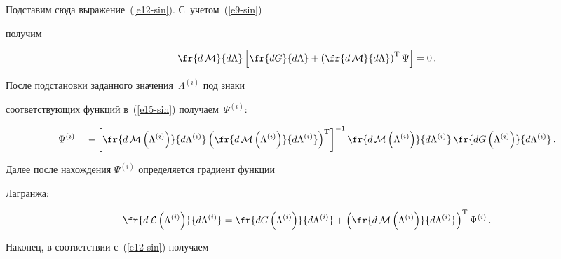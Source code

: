      Подставим сюда выражение~(\ref{e12-sin}). С~учетом~(\ref{e9-sin})

получим

     \begin{equation}

     \fr{d\,\mathcal{M}}{d\Lambda} \left[ \fr{dG}{d\Lambda} +\left(

\fr{d\,\mathcal{M}}{d\Lambda}\right)^{\mathrm{T}} \Psi\right] =0\,.

     \label{e15-sin}

     \end{equation}



     После подстановки заданного значения~$\Lambda^{(i)}$ под знаки

соответствующих функций в~(\ref{e15-sin}) получаем~$\Psi^{(i)}$:

     \begin{equation}

     \Psi^{(i)} =-\left[ \fr{d\,\mathcal{M}\left(\Lambda^{(i)}\right)}

     {d\Lambda^{(i)}}\left(

\fr{ d\,\mathcal{M}\left(\Lambda^{(i)}\right)}{d\Lambda^{(i)}}\right)^{\mathrm{T}} \right]^{-

1} \fr{ d\,\mathcal{M}\left(\Lambda^{(i)}\right)}{d\Lambda^{(i)}}\,

\fr{dG\left(\Lambda^{(i)}\right)}{d\Lambda^{(i)}}\,.

     \label{e16-sin}

     \end{equation}



     Далее после нахождения $\Psi^{(i)}$ определяется градиент функции

Лагранжа:

     \begin{equation*}

     \fr{d\,\mathcal{L}\left(\Lambda^{(i)}\right)}{d\Lambda^{(i)}} =

\fr{dG\left(\Lambda^{(i)}\right)}{d\Lambda^{(i)}}+\left(

\fr{d\,\mathcal{M}\left(\Lambda^{(i)}\right)}{d\Lambda^{(i)}}\right)^{\mathrm{T}}

\Psi^{(i)}\,.


     \end{equation*}



     Наконец, в соответствии с~(\ref{e12-sin}) получаем

